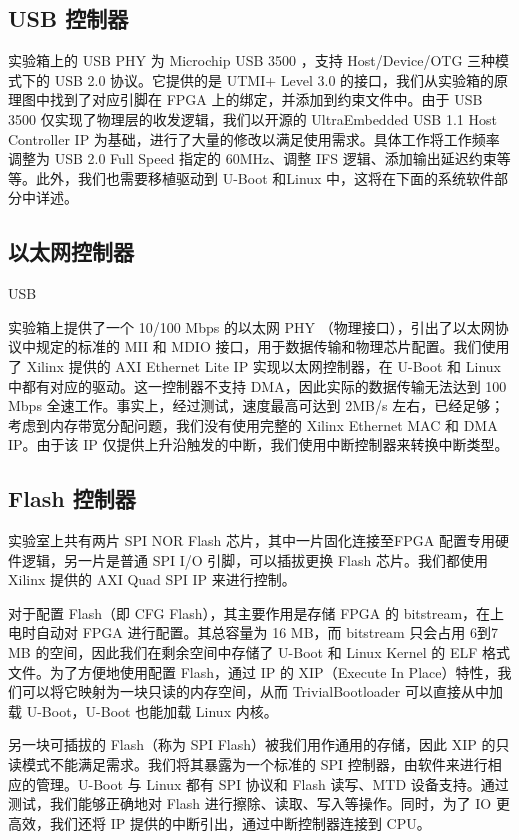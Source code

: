 \subsection{USB 控制器}

实验箱上的 USB PHY 为 Microchip USB 3500 ，支持 Host/Device/OTG 三种模式下的 USB 2.0 协议。它提供的是 UTMI+ Level 3.0 的接口，我们从实验箱的原理图中找到了对应引脚在 FPGA 上的绑定，并添加到约束文件中。由于 USB 3500 仅实现了物理层的收发逻辑，我们以开源的 UltraEmbedded USB 1.1 Host Controller IP 为基础，进行了大量的修改以满足使用需求。具体工作将工作频率调整为 USB 2.0 Full Speed 指定的 60MHz、调整 IFS 逻辑、添加输出延迟约束等等。此外，我们也需要移植驱动到 U-Boot 和Linux 中，这将在下面的系统软件部分中详述。

\subsection{以太网控制器}USB

实验箱上提供了一个 10/100 Mbps 的以太网 PHY （物理接口），引出了以太网协议中规定的标准的 MII 和 MDIO 接口，用于数据传输和物理芯片配置。我们使用了 Xilinx 提供的 AXI Ethernet Lite IP 实现以太网控制器，在 U-Boot 和 Linux 中都有对应的驱动。这一控制器不支持 DMA，因此实际的数据传输无法达到 100 Mbps 全速工作。事实上，经过测试，速度最高可达到 2MB/s 左右，已经足够；考虑到内存带宽分配问题，我们没有使用完整的 Xilinx Ethernet MAC 和 DMA IP。由于该 IP 仅提供上升沿触发的中断，我们使用中断控制器来转换中断类型。

\subsection{Flash 控制器}

实验室上共有两片 SPI NOR Flash 芯片，其中一片固化连接至FPGA 配置专用硬件逻辑，另一片是普通 SPI I/O 引脚，可以插拔更换 Flash 芯片。我们都使用 Xilinx 提供的 AXI Quad SPI IP 来进行控制。

对于配置 Flash（即 CFG Flash），其主要作用是存储 FPGA 的 bitstream，在上电时自动对 FPGA 进行配置。其总容量为 16 MB，而 bitstream 只会占用 6到7 MB 的空间，因此我们在剩余空间中存储了 U-Boot 和 Linux Kernel 的 ELF 格式文件。为了方便地使用配置 Flash，通过 IP 的 XIP（Execute In Place）特性，我们可以将它映射为一块只读的内存空间，从而 TrivialBootloader 可以直接从中加载 U-Boot，U-Boot 也能加载 Linux 内核。

另一块可插拔的 Flash（称为 SPI Flash）被我们用作通用的存储，因此 XIP 的只读模式不能满足需求。我们将其暴露为一个标准的 SPI 控制器，由软件来进行相应的管理。U-Boot 与 Linux 都有 SPI 协议和 Flash 读写、MTD 设备支持。通过测试，我们能够正确地对 Flash 进行擦除、读取、写入等操作。同时，为了 IO 更高效，我们还将 IP 提供的中断引出，通过中断控制器连接到 CPU。

